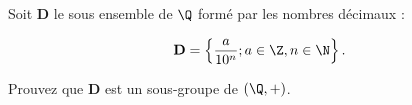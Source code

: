 Soit $\mathbf{D}$ le sous ensemble de $\Q$ formé par les nombres décimaux :

\[\mathbf{D} = \left\{ \dfrac{a}{10^n}; a\in\Z , n \in \N \right\}. \]

Prouvez que $\mathbf{D}$ est un sous-groupe de $(\Q, +)$.